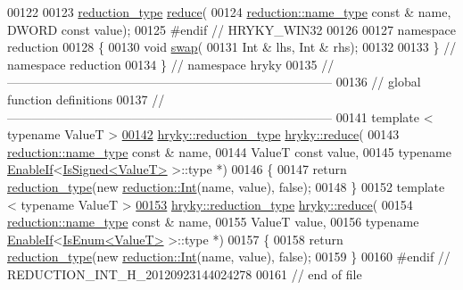 \begin{DoxyCode}
00122 \textcolor{preprocessor}{}
00123     \hyperlink{namespacehryky_a343a9a4c36a586be5c2693156200eadc}{reduction_type} \hyperlink{namespacehryky_af41cb3af6766761da0ff21b84527a52c}{reduce}(
00124         \hyperlink{namespacehryky_1_1reduction_ac686c30a4c8d196bbd0f05629a6b921f}{reduction::name_type} \textcolor{keyword}{const} & name, DWORD \textcolor{keyword}{const} value);
00125 \textcolor{preprocessor}{#endif // HRYKY\_WIN32}
00126 \textcolor{preprocessor}{}
00127 \textcolor{keyword}{namespace }reduction
00128 \{
00130     \textcolor{keywordtype}{void} \hyperlink{namespacehryky_1_1reduction_a493c83efdf5f9e9c49ba77e1b65325a1}{swap}(
00131         Int & lhs, Int & rhs);
00132 
00133 \} \textcolor{comment}{// namespace reduction}
00134 \} \textcolor{comment}{// namespace hryky}
00135 \textcolor{comment}{//
      ------------------------------------------------------------------------------}
00136 \textcolor{comment}{// global function definitions}
00137 \textcolor{comment}{//
      ------------------------------------------------------------------------------}
00141 \textcolor{comment}{}\textcolor{keyword}{template} < \textcolor{keyword}{typename} ValueT >
\hypertarget{reduction__int_8h_source_l00142}{}\hyperlink{namespacehryky_a1d94625c1d85aec5bb089848cd55eaf3}{00142} \hyperlink{classhryky_1_1_intrusive_ptr}{hryky::reduction_type} \hyperlink{namespacehryky_af41cb3af6766761da0ff21b84527a52c}{hryky::reduce}(
00143     \hyperlink{classhryky_1_1reduction_1_1_string}{reduction::name_type} \textcolor{keyword}{const} & name,
00144     ValueT \textcolor{keyword}{const} value,
00145     \textcolor{keyword}{typename} \hyperlink{classhryky_1_1_enable_if}{EnableIf}<\hyperlink{classhryky_1_1_is_signed}{IsSigned<ValueT>} >::type *)
00146 \{
00147     \textcolor{keywordflow}{return} \hyperlink{namespacehryky_a343a9a4c36a586be5c2693156200eadc}{reduction_type}(\textcolor{keyword}{new} \hyperlink{classhryky_1_1reduction_1_1_int}{reduction::Int}(name, value), \textcolor{keyword}{false});
00148 \}
00152 \textcolor{keyword}{template} < \textcolor{keyword}{typename} ValueT >
\hypertarget{reduction__int_8h_source_l00153}{}\hyperlink{namespacehryky_a1bb7073c9b976de9dfe63ab7190b6e28}{00153} \hyperlink{classhryky_1_1_intrusive_ptr}{hryky::reduction_type} \hyperlink{namespacehryky_af41cb3af6766761da0ff21b84527a52c}{hryky::reduce}(
00154     \hyperlink{classhryky_1_1reduction_1_1_string}{reduction::name_type} \textcolor{keyword}{const} & name,
00155     ValueT value,
00156     \textcolor{keyword}{typename} \hyperlink{classhryky_1_1_enable_if}{EnableIf}<\hyperlink{classhryky_1_1_is_enum}{IsEnum<ValueT>} >::type *)
00157 \{
00158     \textcolor{keywordflow}{return} \hyperlink{namespacehryky_a343a9a4c36a586be5c2693156200eadc}{reduction_type}(\textcolor{keyword}{new} \hyperlink{classhryky_1_1reduction_1_1_int}{reduction::Int}(name, value), \textcolor{keyword}{false});
00159 \}
00160 \textcolor{preprocessor}{#endif // REDUCTION\_INT\_H\_20120923144024278}
00161 \textcolor{preprocessor}{}\textcolor{comment}{// end of file}
\end{DoxyCode}
